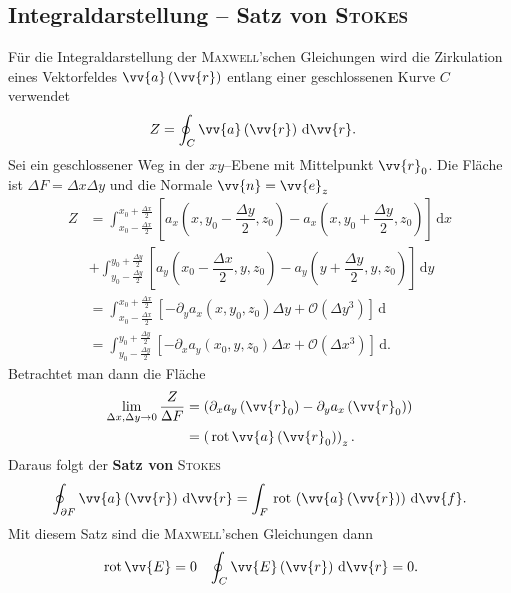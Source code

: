\documentclass[a4paper,12pt]{article}
\newcommand{\td}{\,\text{d}}
\numberwithin{equation}{section}
\begin{document}
\subsection{Integraldarstellung -- Satz von \textsc{Stokes}}
Für die Integraldarstellung der \textsc{Maxwell}'schen Gleichungen wird die Zirkulation eines Vektorfeldes $\vv{a}\left(\vv{r}\right)$ entlang einer geschlossenen Kurve $C$ verwendet
\begin{align} 
        Z&=\oint_{C}^{}\vv{a}\left(\vv{r}\right)\td \vv{r}
.\end{align} 
Sei ein geschlossener Weg in der $xy$--Ebene mit Mittelpunkt $\vv{r}_0$. Die Fläche ist $\Delta F=\Delta x\Delta y$ und die Normale $\vv{n}=\vv{e}_z$ 
\begin{align} 
        Z&=\int_{x_0-\tfrac{\Delta x}{2}}^{x_0+\tfrac{\Delta x}{2}}\left[a_x\left(x,y_0-\dfrac{\Delta y}{2},z_0\right)-a_x\left(x,y_0+\dfrac{\Delta y}{2},z_0\right)\right]\td x\\
         &+\int_{y_0-\tfrac{\Delta y}{2}}^{y_0+\tfrac{\Delta y}{2}}\left[a_y\left(x_0-\dfrac{\Delta x}{2},y,z_0\right)-a_y\left(y+\dfrac{\Delta y}{2},y,z_0\right)\right]\td y\\
         &=\int_{x_0-\tfrac{\Delta x}{2}}^{x_0+\tfrac{\Delta x}{2}}\left[-\partial _ya_x\left(x,y_0,z_0\right)\Delta y+\mathcal{O}\left(\Delta y^3\right)\right]\td \\
         &=\int_{y_0-\tfrac{\Delta y}{2}}^{y_0+\tfrac{\Delta y}{2}}\left[-\partial _xa_y\left(x_0,y,z_0\right)\Delta x+\mathcal{O}\left(\Delta x^3\right)\right]\td 
.\end{align} 
Betrachtet man dann die Fläche
\begin{align} 
        \lim_{\Delta x,\Delta y\rightarrow 0}\dfrac{Z}{\Delta F}&=\left(\partial _xa_y\left(\vv{r}_0\right)-\partial _ya_x\left(\vv{r}_0\right)\right)\\
                                                         &=\left(\,\text{rot}\,\vv{a}\left(\vv{r}_0\right)\right)_z
.\end{align} 
Daraus folgt der \textbf{Satz von} \textsc{Stokes}
\begin{align} 
        \oint_{\partial F}^{}\vv{a}\left(\vv{r}\right)\td \vv{r}=\int_{F}^{}\,\text{rot}\,\left(\vv{a}\left(\vv{r}\right)\right)\td \vv{f}
.\end{align} 
Mit diesem Satz sind die \textsc{Maxwell}'schen Gleichungen dann
\begin{align} 
        \,\text{rot}\,\vv{E}&=0&\oint_{C}^{}\vv{E}\left(\vv{r}\right)\td \vv{r}=0
.\end{align} 
\end{document}

